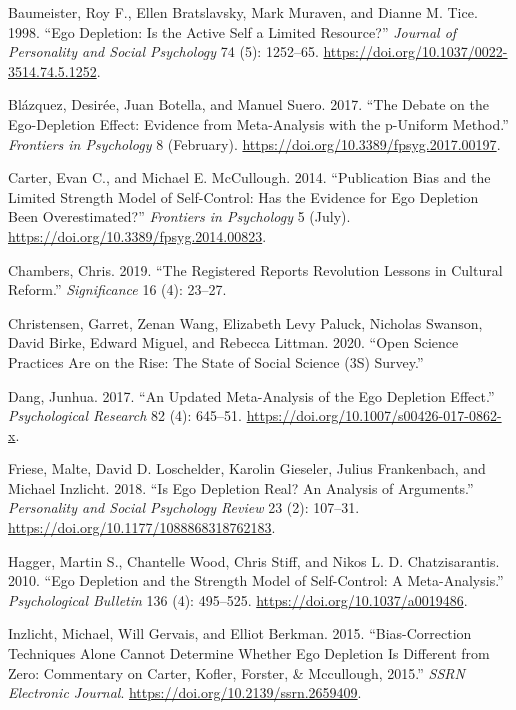 \documentclass[
  letterpaper,
]{book}
\newlength{\cslhangindent}
\newenvironment{CSLReferences}[2] %
 {\begin{list}{}{%
  \setlength{\itemindent}{0pt}
  \setlength{\leftmargin}{0pt}
  \setlength{\parsep}{0pt}
  \ifodd #1
   \setlength{\leftmargin}{\cslhangindent}
   \setlength{\itemindent}{-1\cslhangindent}
  \fi
  \setlength{\itemsep}{#2\baselineskip}}}
 {\end{list}}
\begin{document}
\label{refs}
\begin{CSLReferences}{1}{0}
Baumeister, Roy F., Ellen Bratslavsky, Mark Muraven, and Dianne M. Tice.
1998. {``Ego Depletion: Is the Active Self a Limited Resource?''}
\emph{Journal of Personality and Social Psychology} 74 (5): 1252--65.
\url{https://doi.org/10.1037/0022-3514.74.5.1252}.

Blázquez, Desirée, Juan Botella, and Manuel Suero. 2017. {``The Debate
on the Ego-Depletion Effect: Evidence from Meta-Analysis with the
p-Uniform Method.''} \emph{Frontiers in Psychology} 8 (February).
\url{https://doi.org/10.3389/fpsyg.2017.00197}.

Carter, Evan C., and Michael E. McCullough. 2014. {``Publication Bias
and the Limited Strength Model of Self-Control: Has the Evidence for Ego
Depletion Been Overestimated?''} \emph{Frontiers in Psychology} 5
(July). \url{https://doi.org/10.3389/fpsyg.2014.00823}.

Chambers, Chris. 2019. {``The Registered Reports Revolution Lessons in
Cultural Reform.''} \emph{Significance} 16 (4): 23--27.

Christensen, Garret, Zenan Wang, Elizabeth Levy Paluck, Nicholas
Swanson, David Birke, Edward Miguel, and Rebecca Littman. 2020. {``Open
Science Practices Are on the Rise: The State of Social Science (3S)
Survey.''}

Dang, Junhua. 2017. {``An Updated Meta-Analysis of the Ego Depletion
Effect.''} \emph{Psychological Research} 82 (4): 645--51.
\url{https://doi.org/10.1007/s00426-017-0862-x}.

Friese, Malte, David D. Loschelder, Karolin Gieseler, Julius
Frankenbach, and Michael Inzlicht. 2018. {``Is Ego Depletion Real? An
Analysis of Arguments.''} \emph{Personality and Social Psychology
Review} 23 (2): 107--31. \url{https://doi.org/10.1177/1088868318762183}.

Hagger, Martin S., Chantelle Wood, Chris Stiff, and Nikos L. D.
Chatzisarantis. 2010. {``Ego Depletion and the Strength Model of
Self-Control: A Meta-Analysis.''} \emph{Psychological Bulletin} 136 (4):
495--525. \url{https://doi.org/10.1037/a0019486}.

Inzlicht, Michael, Will Gervais, and Elliot Berkman. 2015.
{``Bias-Correction Techniques Alone Cannot Determine Whether Ego
Depletion Is Different from Zero: Commentary on Carter, Kofler, Forster,
\& Mccullough, 2015.''} \emph{SSRN Electronic Journal}.
\url{https://doi.org/10.2139/ssrn.2659409}.


\end{CSLReferences}
\end{document}
